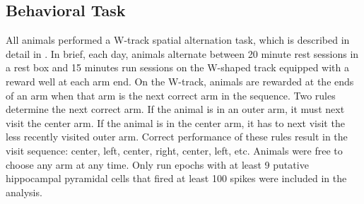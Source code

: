 \documentclass[times, twoside]{zHenriquesLab-StyleBioRxiv}
\begin{document}
\subsection*{Behavioral Task}
All animals performed a W-track spatial alternation task, which is described in detail in \cite{KarlssonAwakereplayremote2009}. In brief, each day, animals alternate between 20 minute rest sessions in a rest box and 15 minutes run sessions on the W-shaped track equipped with a reward well at each arm end. On the W-track, animals are rewarded at the ends of an arm when that arm is the next correct arm in the sequence. Two rules determine the next correct arm. If the animal is in an outer arm, it must next visit the center arm. If the animal is in the center arm, it has to next visit the less recently visited outer arm. Correct performance of these rules result in the visit sequence: center, left, center, right, center, left, etc. Animals were free to choose any arm at any time. Only run epochs with at least 9 putative hippocampal pyramidal cells that fired at least 100 spikes were included in the analysis.
\end{document}

